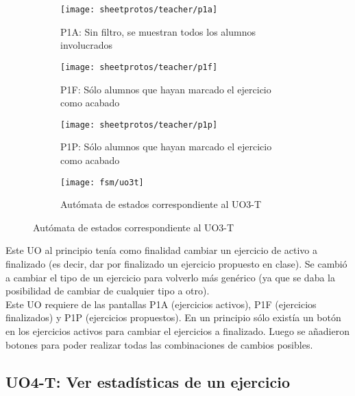 \begin{figure}[H]
\begin{subfigure}[b]{0.3\textwidth}
	\centering
	\texttt{[image: sheetprotos/teacher/p1a]}
	\caption{P1A: Sin filtro, se muestran todos los alumnos involucrados}
	\label{fig:analisis-de-requisitos:funcionales:uo3t:p1a}
\end{subfigure}
%
\begin{subfigure}[b]{0.3\textwidth}
	\centering
	\texttt{[image: sheetprotos/teacher/p1f]}
	\caption{P1F: Sólo alumnos que hayan marcado el ejercicio como acabado}
	\label{fig:analisis-de-requisitos:funcionales:uo3t:p1f}
\end{subfigure}
%
\begin{subfigure}[b]{0.3\textwidth}
	\centering
	\texttt{[image: sheetprotos/teacher/p1p]}
	\caption{P1P: Sólo alumnos que hayan marcado el ejercicio como acabado}
	\label{figanalisis-de-requisitos:funcionales:uo3t:p1P}
\end{subfigure}

\begin{subfigure}[b]{\textwidth}
	\centering
	\texttt{[image: fsm/uo3t]}
	\caption{Autómata de estados correspondiente al UO3-T}
	\label{fig:analisis-de-requisitos:funcionales:uo3t:fsm}
\end{subfigure}

\label{fig:analisis-de-requisitos:funcionales:uo3t:p1}
\end{figure}

Este UO al principio tenía como finalidad cambiar un ejercicio de activo a finalizado (es decir, dar por finalizado un ejercicio propuesto en clase). Se cambió a cambiar el tipo de un ejercicio para volverlo más genérico (ya que se daba la posibilidad de cambiar de cualquier tipo a otro).\\

Este UO requiere de las pantallas P1A (ejercicios activos), P1F (ejercicios finalizados) y P1P (ejercicios propuestos). En un principio sólo existía un botón en los ejercicios activos para cambiar el ejercicios a finalizado. Luego se añadieron botones para poder realizar todas las combinaciones de cambios posibles.\\

\subsection{UO4-T: Ver estadísticas de un ejercicio}
\label{analisis-de-requisitos:funcionales:uo4t}

